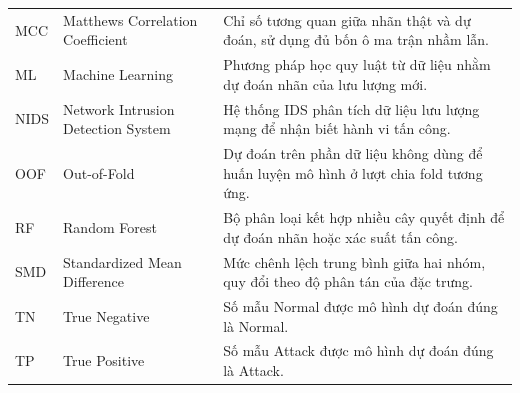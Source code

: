 \begin{longtable}{@{}p{.115\linewidth}p{.345\linewidth}p{.485\linewidth}@{}}
MCC & Matthews Correlation Coefficient & Chỉ số tương quan giữa nhãn thật và dự đoán, sử dụng đủ bốn ô ma trận nhầm lẫn.\\
ML & Machine Learning & Phương pháp học quy luật từ dữ liệu nhằm dự đoán nhãn của lưu lượng mới.\\
NIDS & Network Intrusion Detection System & Hệ thống IDS phân tích dữ liệu lưu lượng mạng để nhận biết hành vi tấn công.\\
OOF & Out-of-Fold & Dự đoán trên phần dữ liệu không dùng để huấn luyện mô hình ở lượt chia fold tương ứng.\\
RF & Random Forest & Bộ phân loại kết hợp nhiều cây quyết định để dự đoán nhãn hoặc xác suất tấn công.\\
SMD & Standardized Mean Difference & Mức chênh lệch trung bình giữa hai nhóm, quy đổi theo độ phân tán của đặc trưng.\\
TN & True Negative & Số mẫu Normal được mô hình dự đoán đúng là Normal.\\
TP & True Positive & Số mẫu Attack được mô hình dự đoán đúng là Attack.\\
\bottomrule
\end{longtable}

